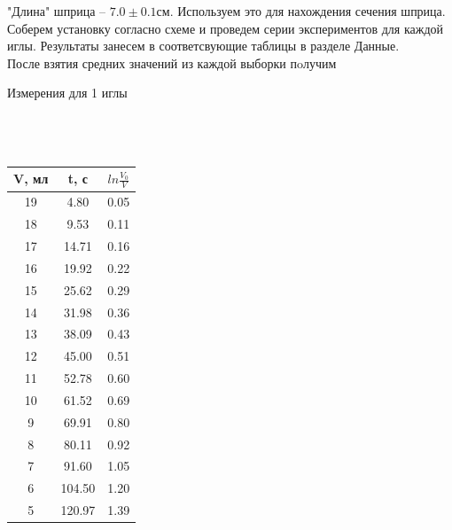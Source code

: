"Длина" шприца -- $7.0 \pm 0.1$см. Используем это для нахождения сечения шприца.\\

Соберем установку согласно схеме и проведем серии экспериментов для каждой иглы. Результаты занесем в соответсвующие таблицы в разделе Данные.\\


После взятия средних значений из каждой выборки пoлучим

\begin{minipage}{0.3\textwidth}
\begin{center}
Измерения для 1 иглы\\
\
\\
\
\\
\
\\

\begin{tabular}{|c|c|c|}
\hline
V, мл&\Delta t, с&$ ln\frac{V_0}{V}$\\
\hline
19 & 4.80 & 0.05 \\
\hline
18 & 9.53 & 0.11 \\
\hline
17 & 14.71 & 0.16 \\
\hline
16 & 19.92 & 0.22 \\
\hline
15 & 25.62 & 0.29 \\
\hline
14 & 31.98 & 0.36 \\
\hline
13 & 38.09 & 0.43 \\
\hline
12 & 45.00 & 0.51 \\
\hline
11 & 52.78 & 0.60 \\
\hline
10 & 61.52 & 0.69 \\
\hline
9 & 69.91 & 0.80 \\
\hline
8 & 80.11 & 0.92 \\
\hline
7 & 91.60 & 1.05 \\
\hline
6 & 104.50 & 1.20\\
\hline
5 & 120.97 & 1.39 \\
\hline
\end{tabular}
\end{center}
\end{minipage}
